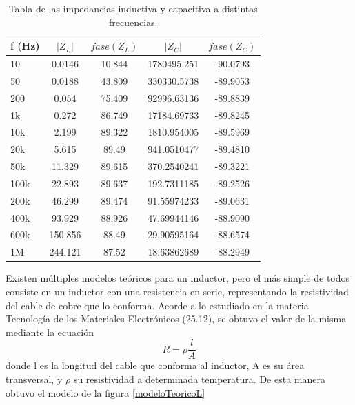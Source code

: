 \begin{table}[H]
    \begin{centering}
        \begin{tabular}{lcccc}
        \toprule
        f (Hz) & $|Z_L|$ & $fase(Z_L)$ & $|Z_C|$ & $fase(Z_C)$ \\
        \midrule
        10   & 0.0146 & 10.844 & 1780495.251 & -90.0793 \\
        50   & 0.0188 & 43.809 & 330330.5738 & -89.9053 \\
        200  & 0.054  & 75.409 & 92996.63136 & -89.8839 \\
        1k   & 0.272  & 86.749 & 17184.69733 & -89.8245 \\
        10k  & 2.199  & 89.322 & 1810.954005 & -89.5969 \\
        20k  & 5.615  & 89.49  & 941.0510477 & -89.4810 \\
        50k  & 11.329 & 89.615 & 370.2540241 & -89.3221 \\
        100k & 22.893 & 89.637 & 192.7311185 & -89.2526 \\
        200k & 46.299 & 89.474 & 91.55974233 & -89.0631 \\
        400k & 93.929 & 88.926 & 47.69944146 & -88.9090 \\
        600k & 150.856& 88.49  & 29.90595164 & -88.6574 \\
        1M   & 244.121& 87.52  & 18.63862689 & -88.2949 \\
        \bottomrule
        \end{tabular}
        \label{tabla:impedanciaInductiva}
        \caption{Tabla de las impedancias inductiva y capacitiva a distintas frecuencias.}
    \end{centering}
\end{table}


Existen múltiples modelos teóricos para un inductor, pero el más simple de todos consiste en un inductor con una resistencia en serie, representando la resistividad del cable de cobre que lo conforma. Acorde a lo estudiado en la materia Tecnología de los Materiales Electrónicos (25.12), se obtuvo el valor de la misma mediante la ecuación
\begin{equation*}
    R = \rho \frac{l}{A}
\end{equation*}
donde  l es la longitud del cable que conforma al inductor, A es su área transversal, y $\rho$ su resistividad a determinada temperatura. De esta manera obtuvo el modelo de la figura \ref{modeloTeoricoL}

